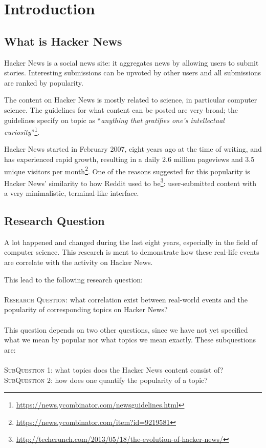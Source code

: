 \section{Introduction}
\subsection{What is Hacker News}
Hacker News is a social news site: it aggregates news by allowing users to submit stories. Interesting submissions can be upvoted by other users and all submissions are ranked by popularity.

The content on Hacker News is mostly related to science, in particular computer science. The guidelines for what content can be posted are very broad; the guidelines specify on topic as ``\textit{anything that gratifies one's intellectual curiosity}''\footnote{\url{https://news.ycombinator.com/newsguidelines.html}}.

Hacker News started in February 2007, eight years ago at the time of writing, and has experienced rapid growth, resulting in a daily 2.6 million pageviews and 3.5 unique visitors per month\footnote{\url{https://news.ycombinator.com/item?id=9219581}}. One of the reasons suggested for this popularity is Hacker News' similarity to how Reddit used to be\footnote{\url{http://techcrunch.com/2013/05/18/the-evolution-of-hacker-news/}}: user-submitted content with a very minimalistic, terminal-like interface.

\subsection{Research Question}
A lot happened and changed during the last eight years, especially in the field of computer science. This research is ment to demonstrate how these real-life events are correlate with the activity on Hacker News.

This lead to the following research question:\\
\\
\textsc{Research Question:} what correlation exist between real-world events and the popularity of corresponding topics on Hacker News?\\
\\
This question depends on two other questions, since we have not yet specified what we mean by popular nor what topics we mean exactly. These subquestions are:\\
\\
\textsc{SubQuestion 1:} what topics does the Hacker News content consist of?\\
\textsc{SubQuestion 2:} how does one quantify the popularity of a topic?

